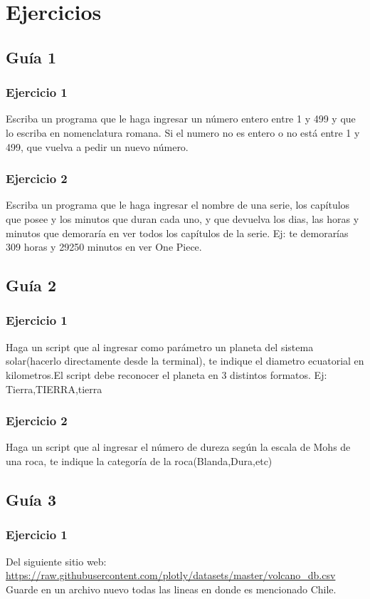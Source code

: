 \chapter{Ejercicios}
\newpage
\section{Guía 1}

\subsection{Ejercicio 1}
Escriba un programa que le haga ingresar un número entero entre 1 y 499 y que lo escriba en nomenclatura romana. Si el numero no es entero o no está entre 1 y 499, que vuelva a pedir un nuevo número.
\subsection{Ejercicio 2}
Escriba un programa que le haga ingresar el nombre de una serie, los capítulos que posee y los minutos que duran cada uno, y que devuelva los dias, las horas y minutos que demoraría en ver todos los capítulos de la serie. Ej: te demorarías 309 horas y 29250 minutos en ver One Piece.
\newpage

\section{Guía 2}
\subsection{Ejercicio 1}
Haga un script que al ingresar como parámetro un planeta del sistema solar(hacerlo directamente desde la terminal), te indique el diametro ecuatorial en kilometros.El script debe reconocer el planeta en 3 distintos formatos. Ej: Tierra,TIERRA,tierra
\subsection{Ejercicio 2}
Haga un script que al ingresar el número de dureza según la escala de Mohs de una roca, te indique la categoría de la roca(Blanda,Dura,etc)
\newpage
\section{Guía 3}
\subsection{Ejercicio 1}
Del siguiente sitio web: \\
\url{https://raw.githubusercontent.com/plotly/datasets/master/volcano_db.csv} \\
Guarde en un archivo nuevo todas las lineas en donde es mencionado Chile.
